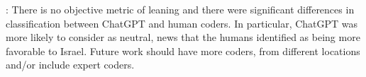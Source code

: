 : There is no objective metric of leaning and there were significant differences in classification between ChatGPT and human coders. In particular, ChatGPT was more likely to consider as neutral, news that the humans identified as being more favorable to Israel. Future work should have more coders, from different locations and/or include expert coders.

